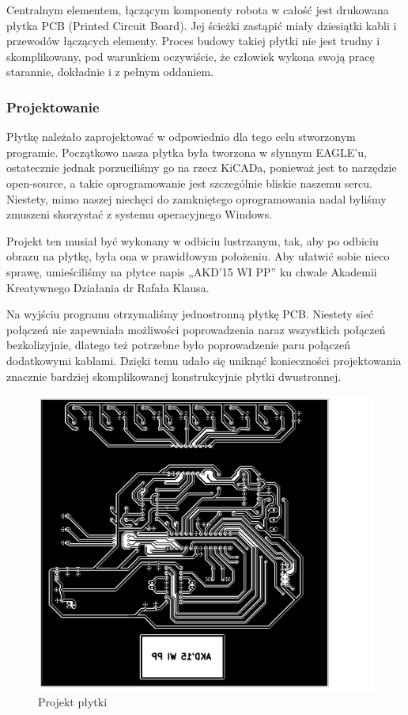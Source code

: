 Centralnym elementem, łączącym komponenty robota w całość jest drukowana płytka PCB (Printed Circuit Board). Jej ścieżki zastąpić miały dziesiątki kabli i przewodów łączących elementy. Proces budowy takiej płytki nie jest trudny i skomplikowany, pod warunkiem oczywiście, że człowiek wykona swoją pracę starannie, dokładnie i z pełnym oddaniem.

\subsubsection{Projektowanie}

Płytkę należało zaprojektować w odpowiednio dla tego celu stworzonym programie. Początkowo nasza płytka była tworzona w słynnym EAGLE'u, ostatecznie jednak porzuciliśmy go na rzecz KiCADa, ponieważ jest to narzędzie open-source, a takie oprogramowanie jest szczególnie bliskie naszemu sercu. Niestety, mimo naszej niechęci do zamkniętego oprogramowania nadal byliśmy zmuszeni skorzystać z systemu operacyjnego Windows.  

Projekt ten musiał być wykonany w odbiciu lustrzanym, tak, aby po odbiciu obrazu na płytkę, była ona w prawidłowym położeniu. Aby ułatwić sobie nieco sprawę, umieściliśmy na płytce napis „AKD’15 WI PP” ku chwale Akademii Kreatywnego Działania dr Rafała Klausa.

Na wyjściu programu otrzymaliśmy jednostronną płytkę PCB. Niestety sieć połączeń nie zapewniała możliwości poprowadzenia naraz wszystkich połączeń bezkolizyjnie, dlatego też potrzebne było poprowadzenie paru połączeń dodatkowymi kablami. Dzięki temu udało się uniknąć konieczności projektowania znacznie bardziej skomplikowanej konstrukcyjnie płytki dwustronnej. 

\begin{figure}
\centering
\includegraphics[scale=0.75]{board.png}
\caption{Projekt płytki}
\end{figure}
